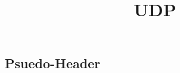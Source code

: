 \documentclass{article}
\title{UDP}
\begin{document}
\maketitle
\subsection*{Psuedo-Header}
\end{document}

